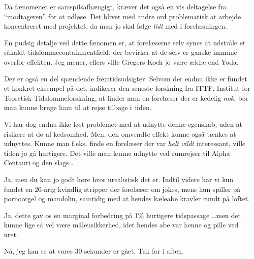 \documentclass[a4paper,11pt]{article}
\begin{document}
\begin{sketch}
 Da fænomenet er samspilsafhængigt, kræver det også en vis
deltagelse fra ``modtageren'' for at udløse. Det bliver med andre ord
problematisk at arbejde koncentreret med projektet, da man jo skal
følge \emph{lidt} med i forelæsningen. 

 En pudsig detalje ved dette fænomen er, at forelæserne selv synes at
udstråle et såkaldt tidslommecontainmentfield, der bevirker at de selv er
ganske immune overfor effekten. Jeg mener, ellers ville Gregers Koch jo være
ældre end Yoda. 

 Der er også en del spændende fremtidsudsigter. Selvom der endnu ikke er
fundet et konkret eksempel på det, indikerer den seneste forskning fra
ITTF, Institut for Teoretisk Tidslommeforskning, at
finder man en forelæser der er kedelig \emph{nok}, bør man kunne bruge ham til at
rejse tilbage i tiden.

 Vi har dog endnu ikke løst problemet med at udnytte denne egenskab, uden
at risikere at dø af kedsomhed. Men, den omvendte effekt kunne også tænkes at
udnyttes. Kunne man f.eks. finde en forelæser der var \emph{helt vildt}
interessant, ville tiden jo gå hurtigere. Det ville man kunne udnytte ved
rumrejser til Alpha Centauri og den slags\ldots

 Ja, men du kan jo godt høre hvor urealistisk det er. Indtil videre har
vi kun fundet en 20-årig kvindlig stripper der forelæser om jokes, mens hun
spiller på pornoorgel og mandolin, samtidig med at hendes kæleabe kravler rundt
på loftet. 

 Ja, dette gav os en marginal forbedring på 1\% hurtigere tidspassage
\ldots men det kunne lige så vel være måleusikkerhed, idet hendes abe var henne
og pille ved uret.
 
 Nå, jeg kan se at vores 30 sekunder er gået. Tak for i aften.


\end{sketch}
\end{document}
